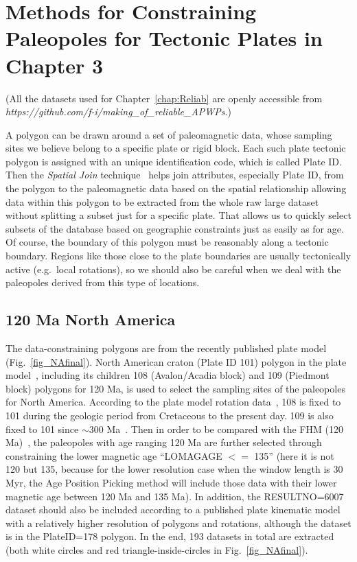 \chapter{Methods for Constraining Paleopoles for Tectonic Plates in Chapter 3}\label{appen4chp3}

(All the datasets used for Chapter~\ref{chap:Reliab} are openly accessible from
\emph{https://github.com/f-i/making\_of\_reliable\_APWPs}.)

A polygon can be drawn around a set of paleomagnetic data, whose sampling sites
we believe belong to a specific plate or rigid block. Each such plate tectonic
polygon is assigned with an unique identification code, which is called Plate
ID\@. Then the {\em Spatial Join\/} technique~\citep{J07} helps join attributes,
especially Plate ID, from the polygon to the paleomagnetic data based on the
spatial relationship allowing data within this polygon to be extracted from the
whole raw large dataset without splitting a subset just for a specific plate.
That allows us to quickly select subsets of the database based on geographic
constraints just as easily as for age. Of course, the boundary of this polygon
must be reasonably along a tectonic boundary. Regions like those close to the
plate boundaries are usually tectonically active (e.g.\ local rotations), so we
should also be careful when we deal with the paleopoles derived from this type
of locations.

\section{120 Ma North America}

The data-constraining polygons are from the recently published plate
model~\citep{Y18} (Fig.~\ref{fig_NAfinal}). North American craton (Plate ID 101)
polygon in the plate model~\citep{Y18}, including its children 108
(Avalon/Acadia block) and 109 (Piedmont block) polygons for 120 Ma,
is used to select the sampling sites of the paleopoles for North America.
According to the plate model rotation data~\citep{Y18}, 108 is fixed to 101
during the geologic period from Cretaceous to the present day. 109 is also fixed
to 101 since ${\sim}300$ Ma~\citep{C14}. Then in order to be compared with the
FHM (120 Ma)~\citep{M93,M99}, the paleopoles with age ranging
120 Ma are further selected through constraining the lower magnetic
age ``LOMAGAGE $<=$ 135'' (here it is not 120 but 135, because for the lower
resolution case when the window length is 30 Myr, the Age Position Picking
method will include those data with their lower magnetic age between 120 Ma and
135 Ma). In addition, the RESULTNO=6007 dataset should also be included
according to a published plate kinematic model~\citep{Mc06}
with a relatively higher resolution of polygons and
rotations, although the dataset is in the PlateID=178 polygon. In the end, 193
datasets in total are extracted (both white circles and red
triangle-inside-circles in Fig.~\ref{fig_NAfinal}).

